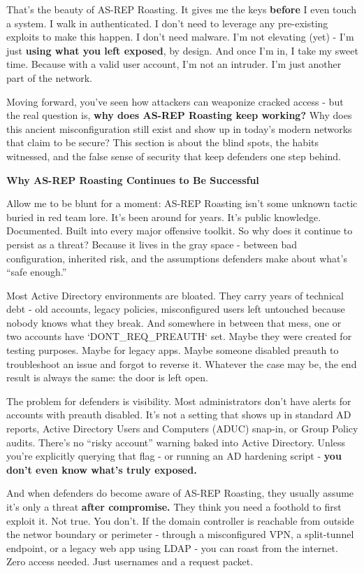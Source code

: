 That’s the beauty of AS-REP Roasting. It gives me the keys \textbf{before} I even touch a system. I walk in authenticated. I don’t need to leverage any pre-existing exploits to make this happen. I don’t need malware. I’m not elevating (yet) - I’m just \textbf{using what you left exposed}, by design. And once I’m in, I take my sweet time. Because with a valid user account, I’m not an intruder. I’m just another part of the network.

Moving forward, you’ve seen how attackers can weaponize cracked access - but the real question is, \textbf{why does AS-REP Roasting keep working? }Why does this ancient misconfiguration still exist and show up in today’s modern networks that claim to be secure? This section is about the blind spots, the habits witnessed, and the false sense of security that keep defenders one step behind.

\textbf{Why AS-REP Roasting Continues to Be Successful}

Allow me to be blunt for a moment: AS-REP Roasting isn’t some unknown tactic buried in red team lore. It’s been around for years. It’s public knowledge. Documented. Built into every major offensive toolkit. So why does it continue to persist as a threat? Because it lives in the gray space - between bad configuration, inherited risk, and the assumptions defenders make about what’s “safe enough.”

Most Active Directory environments are bloated. They carry years of technical debt - old accounts, legacy policies, misconfigured users left untouched because nobody knows what they break. And somewhere in between that mess, one or two accounts have `DONT\_REQ\_PREAUTH` set. Maybe they were created for testing purposes. Maybe for legacy apps. Maybe someone disabled preauth to troubleshoot an issue and forgot to reverse it. Whatever the case may be, the end result is always the same: the door is left open.

The problem for defenders is visibility. Most administrators don’t have alerts for accounts with preauth disabled. It’s not a setting that shows up in standard AD reports, Active Directory Users and Computers (ADUC) snap-in, or Group Policy audits. There’s no “risky account” warning baked into Active Directory. Unless you’re explicitly querying that flag - or running an AD hardening script - \textbf{you don’t even know what’s truly exposed.}

And when defenders do become aware of AS-REP Roasting, they usually assume it’s only a threat \textbf{after compromise. }They think you need a foothold to first exploit it. Not true. You don’t. If the domain controller is reachable from outside the networ boundary or perimeter - through a misconfigured VPN, a split-tunnel endpoint, or a legacy web app using LDAP - you can roast from the internet. Zero access needed. Just usernames and a request packet.

